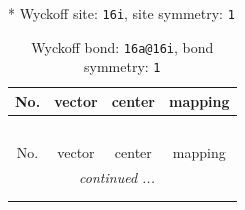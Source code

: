 \documentclass[fleqn,8pt]{jsarticle}
\begin{document}
* Wyckoff site: {\tt 16i}, site symmetry: {\tt 1}
\renewcommand{\arraystretch}{1.2}
\begin{longtable}{cccc}
\caption{Wyckoff bond: {\tt 16a@16i}, bond symmetry: {\tt 1}}
 \\
 \hline \hline
No. & vector & center & mapping \\ \hline \endfirsthead

\multicolumn{3}{l}{\tablename\ \thetable{}} \\
 \hline \hline
No. & vector & center & mapping \\ \hline \endhead

 \hline \hline
\multicolumn{3}{r}{\footnotesize\it continued ...} \\ \endfoot

 \hline \hline
\multicolumn{3}{r}{} \\ \endlastfoot


\end{longtable}
\end{document}
